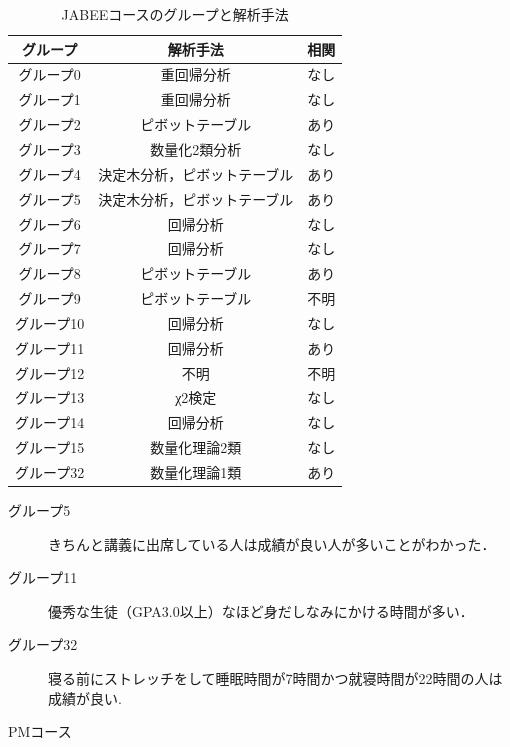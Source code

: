 \begin{table}[hbtp]
  \caption{JABEEコースのグループと解析手法}
  \label{table:data_type}
  \centering
  \begin{tabular}{|c|c|c|}   \hline
    グループ & 解析手法 & 相関  \\ \hline
    グループ0 & 重回帰分析 & なし \\ \hline
    グループ1 & 重回帰分析 & なし \\ \hline
    グループ2 & ピボットテーブル & あり \\ \hline
    グループ3 & 数量化2類分析 & なし \\ \hline
    グループ4 & 決定木分析，ピボットテーブル & あり \\ \hline
    グループ5 & 決定木分析，ピボットテーブル & あり \\ \hline
    グループ6 & 回帰分析 & なし \\ \hline
    グループ7 & 回帰分析 & なし \\ \hline
    グループ8 & ピボットテーブル & あり \\ \hline
    グループ9 & ピボットテーブル & 不明 \\ \hline
    グループ10 & 回帰分析 & なし \\ \hline
    グループ11 & 回帰分析 & あり \\ \hline
    グループ12 & 不明 & 不明 \\ \hline
    グループ13 & χ2検定 & なし \\ \hline
    グループ14 & 回帰分析 & なし \\ \hline
    グループ15 & 数量化理論2類 & なし \\ \hline
    グループ32 & 数量化理論1類 & あり \\ \hline
  \end{tabular}
\end{table}

\begin{description}
  \item[グループ5] きちんと講義に出席している人は成績が良い人が多いことがわかった．
  \item[グループ11] 優秀な生徒（GPA3.0以上）なほど身だしなみにかける時間が多い．
  \item[グループ32] 寝る前にストレッチをして睡眠時間が7時間かつ就寝時間が22時間の人は成績が良い.
\end{description}

\newpage


\begin{description}
 \item[PMコース]\mbox{}\\
\end{description}

